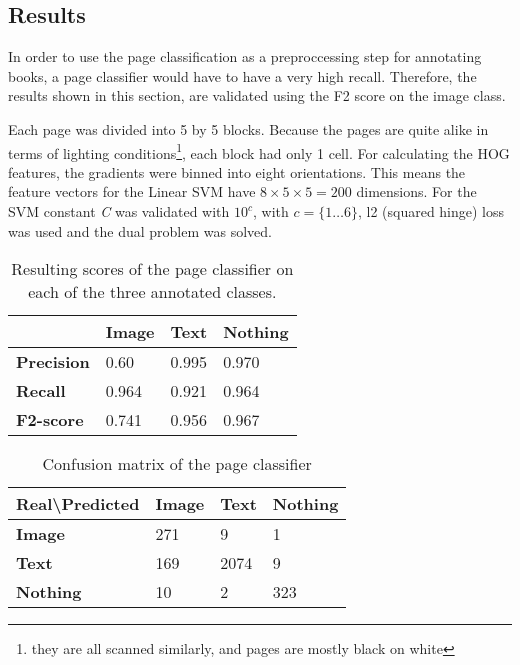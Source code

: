 \subsection{Results}
\label{subsec:pageclasresults}

In order to use the page classification as a preproccessing step for annotating
books, a page classifier would have to have a very high recall. Therefore, the
results shown in this section, are validated using the F2 score on the image
class. 

Each page was divided into 5 by 5 blocks. Because the pages
are quite alike in terms of lighting conditions\footnote{they are all scanned
similarly, and pages are mostly black on white}, each block had only 1 cell. For
calculating the HOG features, the gradients were binned into eight orientations.
This means the feature vectors for the Linear SVM have $8 \times 5 \times 5 =
200$ dimensions. 
For the SVM constant \emph{C} was validated with $10^c$, with $c = \{1 \dots
6\}$, l2 (squared hinge) loss was used and the dual problem was solved. 

\begin{table}
\centering
\begin{tabular}{l l l l}
\hline
  & \textbf{Image} & \textbf{Text} & \textbf{Nothing} \\\hline
\textbf{Precision} & 0.60  & 0.995 & 0.970 \\
\textbf{Recall} & 0.964  & 0.921 & 0.964 \\
\textbf{F2-score} & 0.741 & 0.956 & 0.967 \\\hline
\end{tabular}
\caption{Resulting scores of the page classifier on each of the three annotated
classes.}
\label{tab:pageclasresults}
\end{table}

\begin{table}
\centering
\begin{tabular}{l l l l}
\hline
Real\textbackslash Predicted & \textbf{Image} & \textbf{Text} & \textbf{Nothing} \\\hline
\textbf{Image} & 271 & 9 & 1 \\
\textbf{Text} & 169 & 2074 & 9 \\
\textbf{Nothing} & 10 & 2 & 323\\
\hline
\end{tabular}
\caption{Confusion matrix of the page classifier}
\label{tab:pageclascm}
\end{table}

